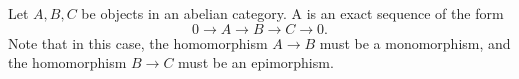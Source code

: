 \documentclass[12pt]{article}
\begin{document}
Let $A,B,C$ be objects in an abelian category.  A {}
is an exact sequence of the form
$$0 \to A \to B \to C \to 0.$$
Note that in this case,
the homomorphism $A \to B$
must be a monomorphism,
and the homomorphism $B \to C$ 
must be an epimorphism.
\end{document}
